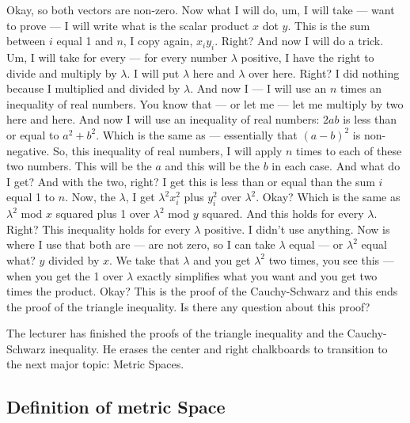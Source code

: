 \begin{spoken-clean}[00:08:20 - 00:10:30]
Okay, so both vectors are non-zero. Now what I will do, um, I will take --- want to prove --- I will write what is the scalar product $x$ dot $y$. This is the sum between $i$ equal 1 and $n$, I copy again, $x_i y_i$. Right? And now I will do a trick. Um, I will take for every --- for every number $\lambda$ positive, I have the right to divide and multiply by $\lambda$. I will put $\lambda$ here and $\lambda$ over here. Right? I did nothing because I multiplied and divided by $\lambda$. And now I --- I will use an $n$ times an inequality of real numbers. You know that --- or let me --- let me multiply by two here and here. And now I will use an inequality of real numbers: $2ab$ is less than or equal to $a^2 + b^2$. Which is the same as --- essentially that $(a-b)^2$ is non-negative. So, this inequality of real numbers, I will apply $n$ times to each of these two numbers. This will be the $a$ and this will be the $b$ in each case. And what do I get? And with the two, right? I get this is less than or equal than the sum $i$ equal 1 to $n$. Now, the $\lambda$, I get $\lambda^2 x_i^2$ plus $y_i^2$ over $\lambda^2$. Okay? Which is the same as $\lambda^2$ mod $x$ squared plus 1 over $\lambda^2$ mod $y$ squared. And this holds for every $\lambda$. Right? This inequality holds for every $\lambda$ positive. I didn't use anything. Now is where I use that both are --- are not zero, so I can take $\lambda$ equal --- or $\lambda^2$ equal what? $y$ divided by $x$. We take that $\lambda$ and you get $\lambda^2$ two times, you see this --- when you get the 1 over $\lambda$ exactly simplifies what you want and you get two times the product. Okay? This is the proof of the Cauchy-Schwarz and this ends the proof of the triangle inequality. Is there any question about this proof?
\end{spoken-clean}

\begin{meta-note}
The lecturer has finished the proofs of the triangle inequality and the Cauchy-Schwarz inequality. He erases the center and right chalkboards to transition to the next major topic: Metric Spaces.
\end{meta-note}

\setcounter{subsection}{1}
\subsection{Definition of metric Space}

